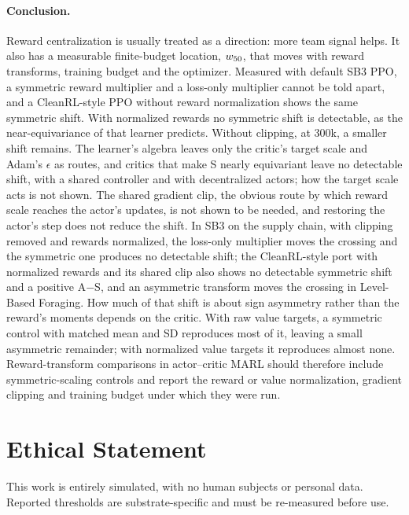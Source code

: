 \paragraph{Conclusion.}
Reward centralization is usually treated as a direction: more team signal helps. It also has a measurable
finite-budget location, $w_{50}$, that moves with reward transforms, training budget and the optimizer.
Measured with default SB3 PPO, a symmetric reward multiplier and a loss-only multiplier cannot be told apart, and a
CleanRL-style PPO without reward normalization shows the same symmetric shift. With normalized rewards no symmetric shift is
detectable, as the near-equivariance of that learner predicts. Without clipping, at 300k, a smaller shift remains. The
learner's algebra leaves only the critic's target scale and Adam's $\epsilon$ as routes, and critics that make S nearly
equivariant leave no detectable shift, with a shared controller and with decentralized actors; how the target scale acts
is not shown. The shared gradient clip, the obvious route by which reward scale reaches the actor's
updates, is not shown to be needed, and restoring the actor's step does not reduce the shift. In SB3 on the supply chain, with
clipping removed and rewards normalized, the loss-only multiplier moves the crossing and the symmetric one produces
no detectable shift; the CleanRL-style port with normalized rewards and its shared clip also shows no detectable
symmetric shift and a positive A$-$S, and an asymmetric transform moves the crossing in Level-Based Foraging. How much of that shift is about sign
asymmetry rather than the reward's moments depends on the critic. With raw value targets, a symmetric control with
matched mean and SD reproduces most of it, leaving a small asymmetric remainder; with normalized value targets it
reproduces almost none. Reward-transform comparisons in
actor--critic MARL should therefore include symmetric-scaling controls and report the reward or value
normalization, gradient clipping and training budget under which they were run.

\section*{Ethical Statement}

This work is entirely simulated, with no human subjects or personal data. Reported thresholds are
substrate-specific and must be re-measured before use.
